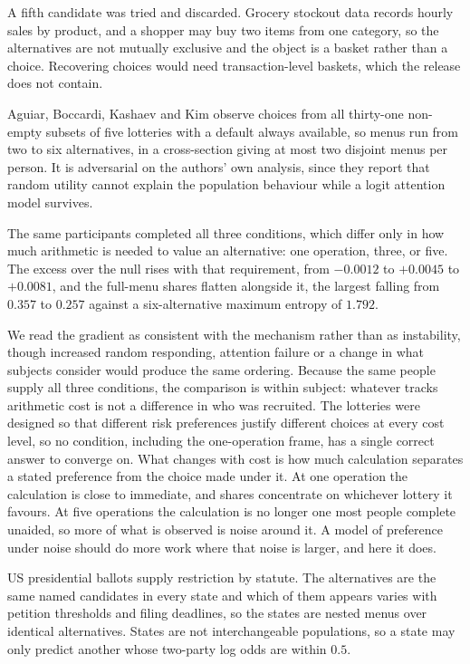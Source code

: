 \documentclass[11pt]{article}
\begin{document}
A fifth candidate was tried and discarded. Grocery stockout data records hourly sales by
product,
and a shopper may buy two items from one category, so the alternatives are not mutually
exclusive and the object is a basket rather than a choice. Recovering choices would need
transaction-level baskets, which the release does not contain.

Aguiar, Boccardi, Kashaev and Kim \cite{aguiar2023} observe choices from all thirty-one
non-empty subsets of five lotteries with a default always available, so menus run from two
to six alternatives, in a cross-section giving at most two disjoint menus per person. It is adversarial on the authors' own
analysis, since they report that random utility cannot explain the population behaviour
while a logit attention model survives.

The same participants completed all three conditions, which differ only in how much
arithmetic is needed to value an alternative: one operation, three, or five. The excess
over the null rises with that requirement, from $-0.0012$ to $+0.0045$ to $+0.0081$, and
the full-menu shares flatten alongside it, the largest falling from $0.357$ to $0.257$
against a six-alternative maximum entropy of $1.792$.

We read the gradient as consistent with the mechanism rather than as instability, though
increased random responding, attention failure or a change in what subjects consider would
produce the same ordering. Because the same people supply all three conditions, the
comparison is within subject: whatever tracks arithmetic cost is not a difference in who was
recruited. The lotteries were designed so that different risk preferences justify different
choices at every cost level, so no condition, including the one-operation frame, has a single
correct answer to converge on. What changes with cost is how much calculation separates a
stated preference from the choice made under it. At one operation the calculation is close to
immediate, and shares concentrate on whichever lottery it favours. At five operations the
calculation is no longer one most people complete unaided, so more of what is observed is
noise around it. A model of preference under noise should do more work where that noise is
larger, and here it does.

US presidential ballots supply restriction by statute. The alternatives are the same named
candidates in every state and which of them appears varies with petition thresholds and
filing deadlines, so the states are nested menus over identical alternatives. States are
not interchangeable populations, so a state may only predict another whose two-party log
odds are within $0.5$.
\end{document}
